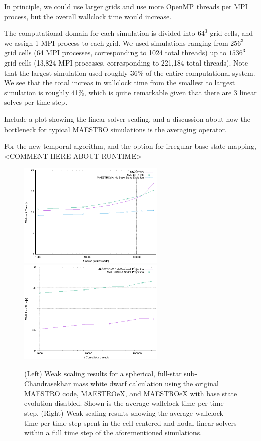 In principle, we could use larger grids and use more OpenMP threads per MPI process, but the overall wallclock time would increase.

The computational domain for each simulation is divided into $64^3$ grid cells, and we assign 1 MPI process to each grid.
We used simulations ranging from $256^3$ grid cells (64 MPI processes, corresponding to 1024 total threads) up to $1536^3$ grid cells (13,824 MPI processes, corresponding to 221,184 total threads).
Note that the largest simulation used roughly 36\% of the entire computational system.
We see that the total increas in wallclock time from the smallest to largest simulation is roughly 41\%, which is quite remarkable given that there are 3 linear solves per time step.

Include a plot showing the linear solver scaling, and a discussion about how the bottleneck for typical MAESTRO simulations is the averaging operator.

For the new temporal algorithm, and the option for irregular base state mapping, <COMMENT HERE ABOUT RUNTIME>

\begin{figure}[htb]
\begin{center}
\includegraphics[width=2.75in]{./figs/MAESTRO_scaling1}
\includegraphics[width=2.75in]{./figs/MAESTRO_scaling2}
\caption{\label{fig:scaling} (Left) Weak scaling results for a spherical, full-star sub-Chandrasekhar mass white dwarf calculation using the original MAESTRO code, MAESTROeX, and MAESTROeX with base state evolution disabled.  Shown is the average wallclock time per time step.
(Right) Weak scaling results showing the average wallclock time per time step spent in the cell-centered and nodal linear solvers within a full time step of the aforementioned simulations.}
\end{center}
\end{figure}


